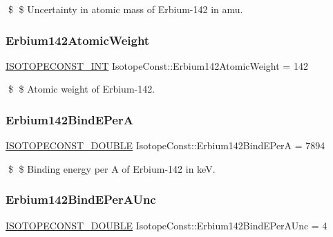 \$ \$ Uncertainty in atomic mass of Erbium-\/142 in amu. \mbox{\label{group___isotope_const-_erbium-_er142_gae7dc47559326b80eb81ba86ff1cbafd7}} 
\subsubsection{\texorpdfstring{Erbium142\+Atomic\+Weight}{Erbium142AtomicWeight}}
{\footnotesize\ttfamily \mbox{\hyperlink{group___isotope_const-_macros_ga5f18360b3e99483a35c32d789e62621c}{I\+S\+O\+T\+O\+P\+E\+C\+O\+N\+S\+T\+\_\+\+I\+NT}} Isotope\+Const\+::\+Erbium142\+Atomic\+Weight = 142}

\$ \$ Atomic weight of Erbium-\/142. \mbox{\label{group___isotope_const-_erbium-_er142_gadfa8b2f00118f1092318831be5ed4aa2}} 
\subsubsection{\texorpdfstring{Erbium142\+Bind\+E\+PerA}{Erbium142BindEPerA}}
{\footnotesize\ttfamily \mbox{\hyperlink{group___isotope_const-_macros_ga8f45a7272ce02c0b4c65c44636ed719a}{I\+S\+O\+T\+O\+P\+E\+C\+O\+N\+S\+T\+\_\+\+D\+O\+U\+B\+LE}} Isotope\+Const\+::\+Erbium142\+Bind\+E\+PerA = 7894}

\$ \$ Binding energy per A of Erbium-\/142 in keV. \mbox{\label{group___isotope_const-_erbium-_er142_gadee38b4f568ebb854ba531fb74d47d3f}} 
\subsubsection{\texorpdfstring{Erbium142\+Bind\+E\+Per\+A\+Unc}{Erbium142BindEPerAUnc}}
{\footnotesize\ttfamily \mbox{\hyperlink{group___isotope_const-_macros_ga8f45a7272ce02c0b4c65c44636ed719a}{I\+S\+O\+T\+O\+P\+E\+C\+O\+N\+S\+T\+\_\+\+D\+O\+U\+B\+LE}} Isotope\+Const\+::\+Erbium142\+Bind\+E\+Per\+A\+Unc = 4}

